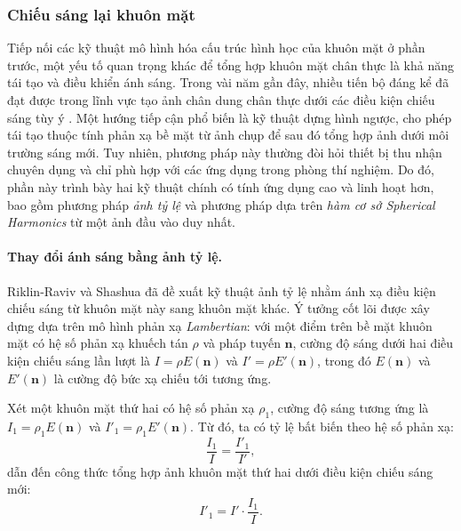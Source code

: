 
\subsubsection{Chiếu sáng lại khuôn mặt}

Tiếp nối các kỹ thuật mô hình hóa cấu trúc hình học của khuôn mặt ở phần trước, một yếu tố quan trọng khác để tổng hợp khuôn mặt chân thực là khả năng tái tạo và điều khiển ánh sáng. Trong vài năm gần đây, nhiều tiến bộ đáng kể đã đạt được trong lĩnh vực tạo ảnh chân dung chân thực dưới các điều kiện chiếu sáng tùy ý \cite{jiang2001face, wang2009shbmm, wen2003face, zhang2003face}. Một hướng tiếp cận phổ biến là kỹ thuật dựng hình ngược, cho phép tái tạo thuộc tính phản xạ bề mặt từ ảnh chụp để sau đó tổng hợp ảnh dưới môi trường sáng mới. Tuy nhiên, phương pháp này thường đòi hỏi thiết bị thu nhận chuyên dụng và chỉ phù hợp với các ứng dụng trong phòng thí nghiệm. Do đó, phần này trình bày hai kỹ thuật chính có tính ứng dụng cao và linh hoạt hơn, bao gồm phương pháp \textit{ảnh tỷ lệ} và phương pháp dựa trên \textit{hàm cơ sở Spherical Harmonics} từ một ảnh đầu vào duy nhất.

\paragraph{Thay đổi ánh sáng bằng ảnh tỷ lệ.}
Riklin-Raviv và Shashua \cite{riklin2001quotient} đã đề xuất kỹ thuật ảnh tỷ lệ nhằm ánh xạ điều kiện chiếu sáng từ khuôn mặt này sang khuôn mặt khác. Ý tưởng cốt lõi được xây dựng dựa trên mô hình phản xạ \textit{Lambertian}: với một điểm trên bề mặt khuôn mặt có hệ số phản xạ khuếch tán $\rho$ và pháp tuyến $\mathbf{n}$, cường độ sáng dưới hai điều kiện chiếu sáng lần lượt là $I = \rho E(\mathbf{n})$ và $I' = \rho E'(\mathbf{n})$, trong đó $E(\mathbf{n})$ và $E'(\mathbf{n})$ là cường độ bức xạ chiếu tới tương ứng.

Xét một khuôn mặt thứ hai có hệ số phản xạ $\rho_1$, cường độ sáng tương ứng là $I_1 = \rho_1 E(\mathbf{n})$ và $I'_1 = \rho_1 E'(\mathbf{n})$. Từ đó, ta có tỷ lệ bất biến theo hệ số phản xạ:
\begin{equation}
    \frac{I_1}{I} = \frac{I'_1}{I'},
\end{equation}
dẫn đến công thức tổng hợp ảnh khuôn mặt thứ hai dưới điều kiện chiếu sáng mới:
\begin{equation}
    \label{eq:ratio_image}
    I'_1 = I' \cdot \frac{I_1}{I}.
\end{equation}

